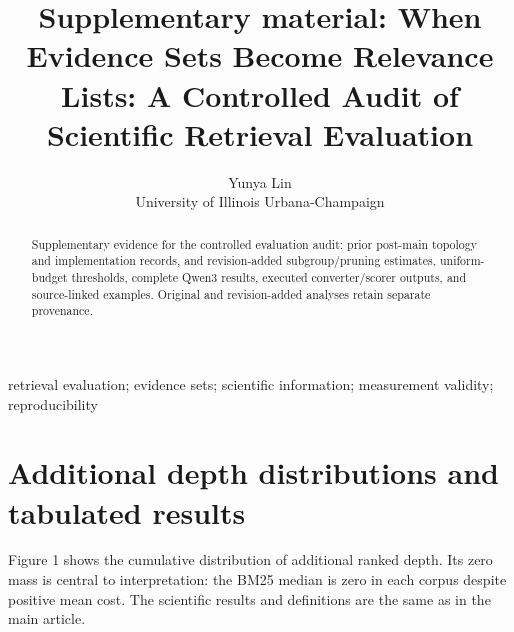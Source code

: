 \documentclass[twoside,a4paper,11pt]{article}
\begin{document}
\title{Supplementary material: When Evidence Sets Become Relevance Lists: A Controlled Audit of Scientific Retrieval Evaluation}
\author{\name Yunya Lin \\ \addr University of Illinois Urbana-Champaign}
\maketitle
\begin{abstract}Supplementary evidence for the controlled evaluation audit: prior post-main topology and implementation records, and revision-added subgroup/pruning estimates, uniform-budget thresholds, complete Qwen3 results, executed converter/scorer outputs, and source-linked examples. Original and revision-added analyses retain separate provenance.\end{abstract}
\begin{keywords}retrieval evaluation; evidence sets; scientific information; measurement validity; reproducibility\end{keywords}

\section{Additional depth distributions and tabulated results}
Figure 1 shows the cumulative distribution of additional ranked depth. Its zero mass is central to interpretation: the BM25 median is zero in each corpus despite positive mean cost. The scientific results and definitions are the same as in the main article.
\end{document}
